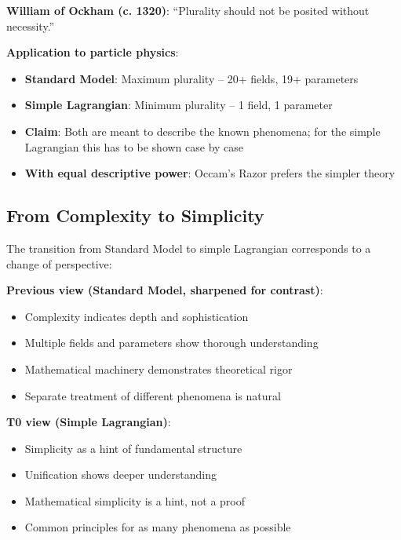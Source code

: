 	\begin{tcolorbox}[colback=blue!5!white,colframe=blue!75!black,title=Occam's Razor]
		\textbf{William of Ockham (c. 1320)}: ``Plurality should not be posited without necessity.''
		
		\textbf{Application to particle physics}:
		\begin{itemize}
			\item \textbf{Standard Model}: Maximum plurality -- 20+ fields, 19+ parameters
			\item \textbf{Simple Lagrangian}: Minimum plurality -- 1 field, 1 parameter
			\item \textbf{Claim}: Both are meant to describe the known phenomena; for the simple Lagrangian this has to be shown case by case
			\item \textbf{With equal descriptive power}: Occam's Razor prefers the simpler theory
		\end{itemize}
	\end{tcolorbox}
	
	\subsection{From Complexity to Simplicity}
	
	The transition from Standard Model to simple Lagrangian corresponds to a change of perspective:
	
	\textbf{Previous view (Standard Model, sharpened for contrast)}:
	\begin{itemize}
		\item Complexity indicates depth and sophistication
		\item Multiple fields and parameters show thorough understanding
		\item Mathematical machinery demonstrates theoretical rigor
		\item Separate treatment of different phenomena is natural
	\end{itemize}
	
	\textbf{T0 view (Simple Lagrangian)}:
	\begin{itemize}
		\item Simplicity as a hint of fundamental structure
		\item Unification shows deeper understanding
		\item Mathematical simplicity is a hint, not a proof
		\item Common principles for as many phenomena as possible
	\end{itemize}

